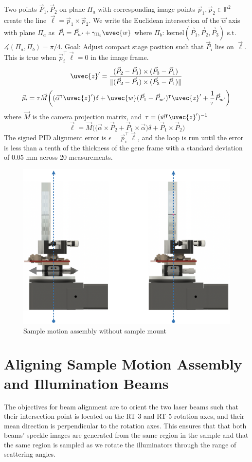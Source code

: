 Two points $\vec{P}_1, \vec{P}_2$ on plane $\Pi_a$ with corresponding image points $\vec{p}_1, \vec{p}_2 \in \mathbb{P}^2$ create the line $\vec{\ell} = \vec{p}_1 \times \vec{p}_2$. We write the Euclidean intersection of the $\vec{w}$ axis with plane $\Pi_a$ as $\vec{P}_i = \vec{P}_{w'} + \gamma_{\Pi_b} \uvec{w}$ where $\Pi_b$: kernel$(\vec{P}_1, \vec{P}_2, \vec{P}_3)$ s.t. $\measuredangle (\Pi_a, \Pi_b) = \pi/4$. Goal: Adjust compact stage position such that $\vec{P}_i$ lies on $\vec{\ell}$. This is true when $\vec{p}^\intercal_i \vec{\ell} = 0$ in the image frame.
\begin{equation}
    \uvec{z}' = \frac{(\vec{P}_2 - \vec{P}_1) \times (\vec{P}_3 - \vec{P}_1)}{\|(\vec{P}_2 - \vec{P}_1) \times (\vec{P}_3 - \vec{P}_1)\|}
\end{equation}
%
\begin{equation}
    \vec{p}_i = \tau \vec{M}\bigg((\vec{\alpha}^\intercal \uvec{z}') \delta + \uvec{w}(\vec{P}_1 - \vec{P}_{w'})^\intercal \uvec{z}'  + \frac{1}{\tau} \vec{P}_{w'} \bigg)
\end{equation}
where $\vec{M}$ is the camera projection matrix, and $\tau = (\vec{w}^\intercal \uvec{z}')^{-1}$
\begin{equation}
    \vec{\ell} = \vec{M} \Big(\big(\vec{\alpha} \times \vec{P}_2 + \vec{P}_1 \times \vec{\alpha}\big)\delta + \vec{P}_1 \times \vec{P}_2 \Big)
\end{equation}
%
The signed PID alignment error is $\epsilon = \vec{p}^\intercal_i \vec{\ell}$, and the loop is run until the error is less than a tenth of the thickness of the gene frame with a standard deviation of 0.05 mm across 20 measurements.

\begin{figure}
    \centering
    \includegraphics[width=0.5\linewidth]{figures/compact_alignment.png}
    \caption{Sample motion assembly without sample mount}
    \label{fig:compact_alignment}
\end{figure}

\section{Aligning Sample Motion Assembly and Illumination Beams} %
The objectives for beam alignment are to orient the two laser beams such that their intersection point is located on the RT-3 and RT-5 rotation axes, and their mean direction is perpendicular to the rotation axes. This ensures that that both beams' speckle images are generated from the same region in the sample and that the same region is sampled as we rotate the illuminators through the range of scattering angles.

